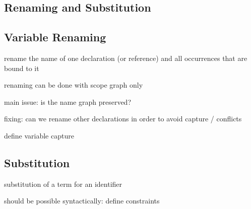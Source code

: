 	

\subsection{Renaming and Substitution}
	
\subsection{Variable Renaming}
	
	rename the name of one declaration (or reference) and all occurrences that are
	bound to it
	
	renaming can be done with scope graph only
	
	main issue: is the name graph preserved?
	
	fixing: can we rename other declarations in order to avoid capture / conflicts
	
	define variable capture
	
\subsection{Substitution}
	
	substitution of a term for an identifier
	
	should be possible syntactically: define constraints
	

